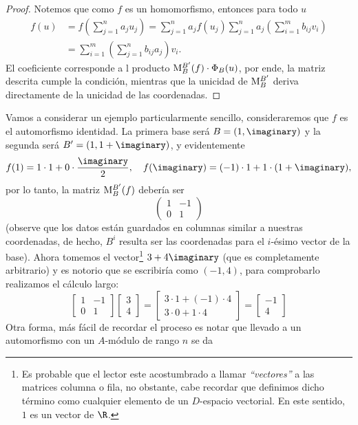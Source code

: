 \documentclass[11pt,oneside]{book}
\begin{document}
\begin{proof}
Notemos que como $f$ es un homomorfismo, entonces para todo $u$
\begin{align*}
f(u)&=f\left(\sum_{j=1}^n a_ju_j\right)=\sum_{j=1}^n a_jf(u_j)\sum_{j=1}^na_j\left(\sum_{i=1}^mb_{ij}v_i\right)\\
&=\sum_{i=1}^m\left(\sum_{j=1}^n b_{ij}a_j\right)v_i.
\end{align*}
El coeficiente corresponde a l producto ${\rm M}_B^{B'}(f)\cdot\Phi_B(u)$, por ende, la matriz descrita cumple la condición, mientras que la unicidad de ${\rm M}_B^{B'}$ deriva directamente de la unicidad de las coordenadas.
\end{proof}
Vamos a considerar un ejemplo particularmente sencillo, consideraremos que $f$ es el automorfismo identidad. La primera base será $B=(1,\imaginary)$ y la segunda será $B'=(1,1+\imaginary)$, y evidentemente
$$f(1)=1\cdot 1+0\cdot\frac{\imaginary}{2},\quad f(\imaginary)=(-1)\cdot 1+1\cdot(1+\imaginary),$$
por lo tanto, la matriz ${\rm M}_B^{B'}(f)$ debería ser
$$\begin{pmatrix}
1 & -1 \\
0 & 1
\end{pmatrix}$$
(observe que los datos están guardados en columnas similar a nuestras coordenadas, de hecho, $B^i$ resulta ser las coordenadas para el $i$-ésimo vector de la base). Ahora tomemos el vector\footnote{Es probable que el lector este acostumbrado a llamar \textit{``vectores''} a las matrices columna o fila, no obstante, cabe recordar que definimos dicho término como cualquier elemento de un $D$-espacio vectorial. En este sentido, $1$ es un vector de $\R$.} $3+4\imaginary$ (que es completamente arbitrario) y es notorio que se escribiría como $(-1,4)$, para comprobarlo realizamos el cálculo largo:
$$\begin{bmatrix}
1 & -1\\ 0 & 1
\end{bmatrix}
\begin{bmatrix}
3\\ 4
\end{bmatrix}
=
\begin{bmatrix}
3\cdot 1+(-1)\cdot 4\\ 3\cdot 0+1\cdot 4
\end{bmatrix}
=
\begin{bmatrix}
-1\\4
\end{bmatrix}$$
Otra forma, más fácil de recordar el proceso es notar que llevado a un automorfismo con un $A$-módulo de rango $n$ se da
\end{document}
